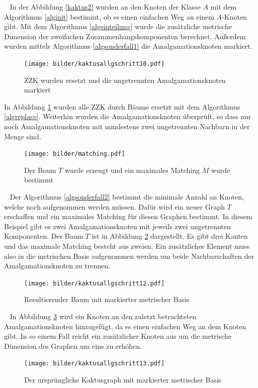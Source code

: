 \begin{bsp}
~\linebreak
In der Abbildung \ref{kaktus2} wurden an den Knoten der Klasse $A$ mit dem Algorithmus \ref{alginit} bestimmt, ob es einen einfachen Weg an einem $A$-Knoten gibt. Mit dem Algorithmus \ref{algeinteilung} wurde die zusätzliche metrische Dimension der zweifachen Zusammenhangskomponenten berechnet. Außerdem wurden mittels Algorithmus \ref{algsonderfall1} die Amalgamationsknoten markiert.
\vspace{-3mm}
  	   	 \begin{figure}[h!]
		\centering
 		 \texttt{[image: bilder/kaktusallgschritt10.pdf]}
   \caption{ZZK wurden ersetzt und die ungetrennten Amalgamationsknoten markiert}
   \label{kaktus4}
  	 \end{figure}
\newpage In Abbildung \ref{kaktus4} wurden alle ZZK durch Bäume ersetzt mit dem Algorithmus \ref{algreplace}. Weiterhin wurden die Amalgamationsknoten überprüft, so dass nur noch Amalgamationsknoten mit mindestens zwei ungetrennten Nachbarn in der Menge sind.\newline
\vspace{-1mm}
  	   	 \begin{figure}[h!]
		\centering
 		 \texttt{[image: bilder/matching.pdf]}
   \caption{Der Baum $T$ wurde erzeugt und ein maximales Matching $M$ wurde bestimmt}
   \label{matching}
  	 \end{figure}
  	 \vspace{-3mm}
  	 ~\linebreak 
Der Algorithmus \ref{algsonderfall2} bestimmt die minimale Anzahl an Knoten, welche noch aufgenommen werden müssen. Dafür wird ein neuer Graph $T$ erschaffen und ein maximales Matching für diesen Graphen bestimmt. In diesem Beispiel gibt es zwei Amalgamationsknoten mit jeweils zwei ungetrennten Komponenten. Der Baum $T$ ist in Abbildung \ref{matching} dargestellt. Es gibt drei Kanten und das maximale Matching besteht aus zweien. Ein zusätzliches Element muss also in die metrischen Basis aufgenommen werden um beide Nachbarschaften der Amalgamationsknoten zu trennen.
\vspace{-1mm}
  	   	 \begin{figure}[h!]
		\centering
 		 \texttt{[image: bilder/kaktusallgschritt12.pdf]}
   \caption{Resultierender Baum mit markierter metrischer Basis}
   \label{kaktus6}
  	 \end{figure}
  	 \vspace{-3mm}
  	 ~\linebreak 
  	 In Abbildung \ref{kaktus6} wird ein Knoten an den zuletzt betrachteten Amalgamationsknoten hinzugefügt, da es einen einfachen Weg an dem Knoten gibt. In so einem Fall reicht ein zusätzlicher Knoten aus um die metrische Dimension des Graphen um eins zu erhöhen.
  	
  	 \begin{figure}[h!]
		\centering
 		 \texttt{[image: bilder/kaktusallgschritt13.pdf]}
   \caption{Der ursprüngliche Kaktusgraph mit markierter metrischer Basis}
   \label{kaktus7}
  	 \end{figure}
  	 \end{bsp}
